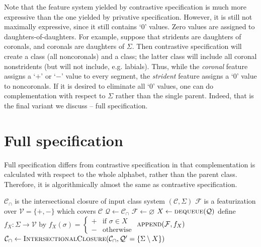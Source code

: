 \documentclass[11pt, oneside]{article}   	%
\begin{document}
\noindent Note that the feature system yielded by contrastive specification is much more expressive than the one yielded by privative specification. However, it is still not maximally expressive, since it still contains `$0$' values. Zero values are assigned to daughters-of-daughters. For example, suppose that stridents are daughters of coronals, and coronals are daughters of $\Sigma$. Then contrastive specification will create a  class (all noncoronals) and a  class; the latter class will include all coronal nonstridents (but will not include, e.g. labials). Thus, while the \textit{coronal} feature assigns a `$+$' or `$-$' value to every segment, the \textit{strident} feature assigns a `$0$' value to noncoronals. If it is desired to eliminate all `$0$' values, one can do complementation with respect to $\Sigma$ rather than the single parent. Indeed, that is the final variant we discuss -- full specification.

\section{Full specification}

Full specification differs from contrastive specification in that complementation is calculated with respect to the whole alphabet, rather than the parent class. Therefore, it is algorithmically almost the same as contrastive specification.

\vspace{\baselineskip} \noindent \begin{algorithmic}
    \REQUIRE $\mathcal C_\cap$ is the intersectional closure of input class system $(\mathcal C, \Sigma)$
    \ENSURE $\mathcal F$ is a featurization over $\mathcal V = \{ +, - \}$ which covers $\mathcal C$
    \STATE
    \STATE $\mathcal Q \leftarrow \mathcal C_\cap$
    \STATE $\mathcal F \leftarrow \varnothing$
    \STATE
        \STATE $X \leftarrow \textsc{dequeue}(\mathcal Q)$
            \STATE define $f_X : \Sigma \rightarrow \mathcal V$ by $f_X (\sigma) = \begin{cases}
                    + & \text{if } \sigma \in X \\
                    - & \text{otherwise}
                    \end{cases}$
            \STATE $\textsc{append}(\mathcal F, f_X)$
            \STATE
            \STATE $\mathcal C_\cap \leftarrow \textsc{IntersectionalClosure}(\mathcal C_\cap, \mathcal Q' = \{\Sigma \setminus X\})$
        \ENDIF
    \ENDWHILE
\end{algorithmic}
\end{document}
